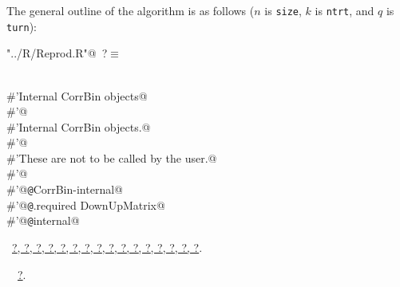 \documentclass[reqno]{amsart}
\renewcommand{\NWtarget}[2]{\hypertarget{#1}{#2}}
\renewcommand{\NWlink}[2]{\hyperlink{#1}{#2}}
\begin{document}
The general outline of the algorithm is as follows ($n$ is \texttt{size}, 
$k$ is \texttt{ntrt}, and $q$ is \texttt{turn}):
\begin{flushleft} \small\label{scrap15}\raggedright\small
\NWtarget{nuweb?}{} \verb@"../R/Reprod.R"@\nobreak\ {\footnotesize {?}}$\equiv$
\vspace{-1ex}
\begin{list}{}{} \item
\mbox{}\verb@@\\
\mbox{}\verb@#'Internal CorrBin objects@\\
\mbox{}\verb@#'@\\
\mbox{}\verb@#'Internal CorrBin objects.@\\
\mbox{}\verb@#'@\\
\mbox{}\verb@#'These are not to be called by the user.@\\
\mbox{}\verb@#'@\\
\mbox{}\verb@#'@{\tt @}\verb@rdname CorrBin-internal@\\
\mbox{}\verb@#'@{\tt @}\verb@aliases .required DownUpMatrix@\\
\mbox{}\verb@#'@{\tt @}\verb@keywords internal@\\
\mbox{}\verb@@{\NWsep}
\end{list}
\vspace{-1.5ex}
\footnotesize
\begin{list}{}{\setlength{\itemsep}{-\parsep}\setlength{\itemindent}{-\leftmargin}}
\item \NWtxtFileDefBy\ \NWlink{nuweb?}{?}\NWlink{nuweb?}{, ?}\NWlink{nuweb?}{, ?}\NWlink{nuweb?}{, ?}\NWlink{nuweb?}{, ?}\NWlink{nuweb?}{, ?}\NWlink{nuweb?}{, ?}\NWlink{nuweb?}{, ?}\NWlink{nuweb?}{, ?}\NWlink{nuweb?}{, ?}\NWlink{nuweb?}{, ?}\NWlink{nuweb?}{, ?}\NWlink{nuweb?}{, ?}\NWlink{nuweb?}{, ?}\NWlink{nuweb?}{, ?}\NWlink{nuweb?}{, ?}.
\item \NWtxtIdentsUsed\nobreak\  \verb@DownUpMatrix@\nobreak\ \NWlink{nuweb?}{?}.
\item{}
\end{list}
\vspace{4ex}
\end{flushleft}
\end{document}
